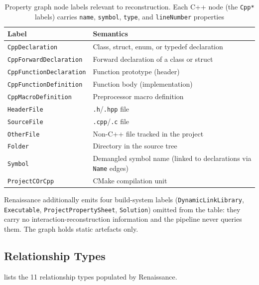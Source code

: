 \begin{table}[htb]
\centering
\caption{Property graph node labels relevant to reconstruction. Each C++
  node (the \texttt{Cpp*} labels) carries \texttt{name}, \texttt{symbol}, \texttt{type}, and
  \texttt{lineNumber} properties}
\label{tab:node-types}
\small
\begin{tabular}{@{} l p{9cm} @{}}
\toprule
\textbf{Label} & \textbf{Semantics} \\
\midrule
\texttt{CppDeclaration}           & Class, struct, enum, or typedef declaration \\
\texttt{CppForwardDeclaration}    & Forward declaration of a class or struct \\
\texttt{CppFunctionDeclaration}   & Function prototype (header) \\
\texttt{CppFunctionDefinition}    & Function body (implementation) \\
\texttt{CppMacroDefinition}       & Preprocessor macro definition \\
\texttt{HeaderFile}               & \texttt{.h}/\texttt{.hpp} file \\
\texttt{SourceFile}               & \texttt{.cpp}/\texttt{.c} file \\
\texttt{OtherFile}                & Non-C++ file tracked in the project \\
\texttt{Folder}                   & Directory in the source tree \\
\texttt{Symbol}                   & Demangled symbol name (linked to declarations via \texttt{Name} edges) \\
\texttt{ProjectCOrCpp}            & CMake compilation unit \\
\bottomrule
\end{tabular}
\end{table}

Renaissance additionally emits four build-system labels
(\texttt{DynamicLinkLibrary}, \texttt{Executable},
\texttt{ProjectPropertySheet}, \texttt{Solution}) omitted from the table:
they carry no interaction-reconstruction information and the pipeline
never queries them. The graph holds static artefacts only.

\subsection{Relationship Types}\label{sec:edge-types}

 lists the 11 relationship types populated by
Renaissance.

